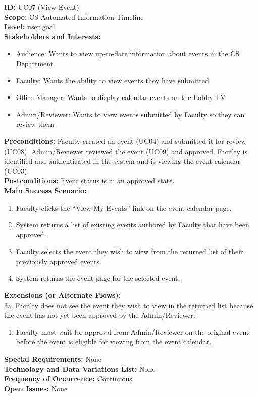 \textbf{ID:} UC07 (View Event) \\
\textbf{Scope:} CS Automated Information Timeline \\
\textbf{Level:} user goal \\
\textbf{Stakeholders and Interests:}
\begin{itemize}
    \item Audience: Wants to view up-to-date information about events in the CS Department
    \item Faculty: Wants the ability to view events they have submitted
    \item Office Manager: Wants to display calendar events on the Lobby TV
    \item Admin/Reviewer: Wants to view events submitted by Faculty so they can review them
\end{itemize}
\textbf{Preconditions:} Faculty created an event (UC04) and submitted it for review (UC08). Admin/Reviewer reviewed the event (UC09) and approved. Faculty is identified and authenticated in the system and is viewing the event calendar (UC03). \\
\textbf{Postconditions:} Event status is in an approved state. \\
\textbf{Main Success Scenario:}
\begin{enumerate}
    \item Faculty clicks the “View My Events” link on the event calendar page.
    \item System returns a list of existing events authored by Faculty that have been approved.
    \item Faculty selects the event they wish to view from the returned list of their previously approved events.
    \item System returns the event page for the selected event.
\end{enumerate}
\textbf{Extensions (or Alternate Flows):} \\
3a. Faculty does not see the event they wish to view in the returned list because the event has not yet been approved by the Admin/Reviewer:
\begin{enumerate}
    \item Faculty must wait for approval from Admin/Reviewer on the original event before the event is eligible for viewing from the event calendar.
\end{enumerate}
\textbf{Special Requirements:} None \\
\textbf{Technology and Data Variations List:} None \\
\textbf{Frequency of Occurrence:} Continuous \\
\textbf{Open Issues:} None \\

